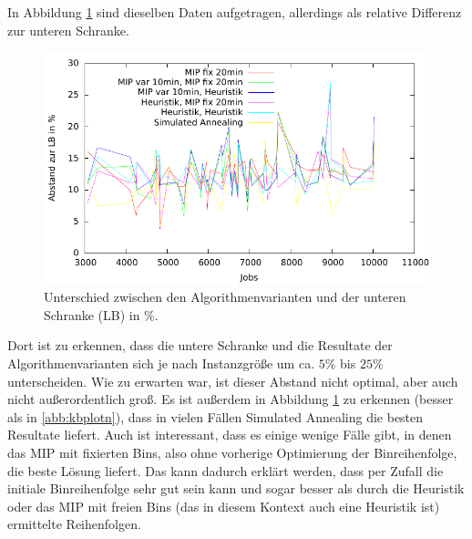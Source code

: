 \documentclass{scrreprt}
\begin{document}
In Abbildung \ref{abb:kbplotreln} sind dieselben Daten aufgetragen, allerdings als relative Differenz zur unteren Schranke.
\begin{figure}
    \begin{center}
        \includegraphics[width=.8\textwidth]{../prog/binpacking/results/kbplotreln.pdf}
    \end{center}
    \caption{
        \label{abb:kbplotreln}
        Unterschied zwischen den Algorithmenvarianten und der unteren Schranke (LB) in \%.
    }
\end{figure}
Dort ist zu erkennen, dass die untere Schranke und die Resultate der Algorithmenvarianten sich je nach Instanzgröße um ca. $5\%$ bis $25\%$ unterscheiden.
Wie zu erwarten war, ist dieser Abstand nicht optimal, aber auch nicht außerordentlich groß.
Es ist außerdem in Abbildung \ref{abb:kbplotreln} zu erkennen (besser als in \ref{abb:kbplotn}), dass in vielen Fällen Simulated Annealing die besten Resultate liefert.
Auch ist interessant, dass es einige wenige Fälle gibt, in denen das MIP mit fixierten Bins, also ohne vorherige Optimierung der Binreihenfolge, die beste Lösung liefert.
Das kann dadurch erklärt werden, dass per Zufall die initiale Binreihenfolge sehr gut sein kann und sogar besser als durch die Heuristik oder das MIP mit freien Bins 
(das in diesem Kontext auch eine Heuristik ist) ermittelte Reihenfolgen.
\end{document}
